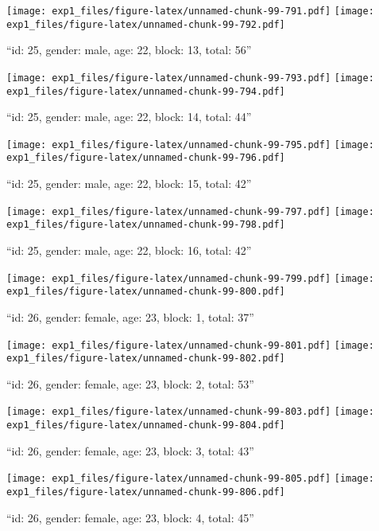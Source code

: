 \documentclass[,]{article}
\begin{document}
\texttt{[image: exp1\_files/figure-latex/unnamed-chunk-99-791.pdf]}
\texttt{[image: exp1\_files/figure-latex/unnamed-chunk-99-792.pdf]}

\newpage
[1] 

``id: 25, gender: male, age: 22, block: 13, total: 56''

\texttt{[image: exp1\_files/figure-latex/unnamed-chunk-99-793.pdf]}
\texttt{[image: exp1\_files/figure-latex/unnamed-chunk-99-794.pdf]}

\newpage
[1] 

``id: 25, gender: male, age: 22, block: 14, total: 44''

\texttt{[image: exp1\_files/figure-latex/unnamed-chunk-99-795.pdf]}
\texttt{[image: exp1\_files/figure-latex/unnamed-chunk-99-796.pdf]}

\newpage
[1] 

``id: 25, gender: male, age: 22, block: 15, total: 42''

\texttt{[image: exp1\_files/figure-latex/unnamed-chunk-99-797.pdf]}
\texttt{[image: exp1\_files/figure-latex/unnamed-chunk-99-798.pdf]}

\newpage
[1] 

``id: 25, gender: male, age: 22, block: 16, total: 42''

\texttt{[image: exp1\_files/figure-latex/unnamed-chunk-99-799.pdf]}
\texttt{[image: exp1\_files/figure-latex/unnamed-chunk-99-800.pdf]}

\newpage
[1] 

``id: 26, gender: female, age: 23, block: 1, total: 37''

\texttt{[image: exp1\_files/figure-latex/unnamed-chunk-99-801.pdf]}
\texttt{[image: exp1\_files/figure-latex/unnamed-chunk-99-802.pdf]}

\newpage
[1] 

``id: 26, gender: female, age: 23, block: 2, total: 53''

\texttt{[image: exp1\_files/figure-latex/unnamed-chunk-99-803.pdf]}
\texttt{[image: exp1\_files/figure-latex/unnamed-chunk-99-804.pdf]}

\newpage
[1] 

``id: 26, gender: female, age: 23, block: 3, total: 43''

\texttt{[image: exp1\_files/figure-latex/unnamed-chunk-99-805.pdf]}
\texttt{[image: exp1\_files/figure-latex/unnamed-chunk-99-806.pdf]}

\newpage
[1] 

``id: 26, gender: female, age: 23, block: 4, total: 45''
\end{document}
